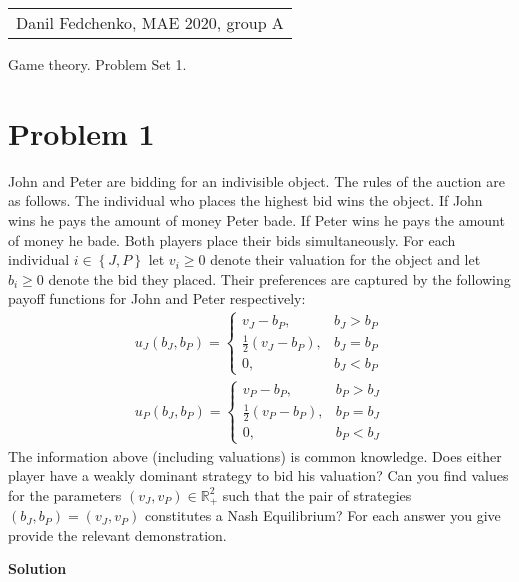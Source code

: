 \documentclass[a4paper]{article}
\begin{document}
	\begin{flushright}
	\begin{tabular}{r}
		Danil Fedchenko, MAE 2020, group A \\
	\end{tabular}
\end{flushright}


\begin{center}
	Game theory. Problem Set 1.
\end{center}
\section*{Problem 1}
John and Peter are bidding for an indivisible object. The rules of the
auction are as follows. The individual who places the highest bid wins the
object. If John wins he pays the amount of money Peter bade. If Peter
wins he pays the amount of money he bade. Both players place their bids
simultaneously. For each individual $i \in \left\{J, P\right\}$ let $v_i \ge 0$ denote their
valuation for the object and let $b_i \ge 0$ denote the bid they placed. Their
preferences are captured by the following payoff functions for John and
Peter respectively:
\begin{align*}
u_J(b_J, b_P) = \begin{cases}
v_J - b_P, &b_J > b_P\\
\frac{1}{2}(v_J - b_P), &b_J = b_P\\
0, &b_J < b_P
\end{cases}\\
u_P(b_J, b_P) = \begin{cases}
v_P - b_P, &b_P > b_J\\
\frac{1}{2}(v_P - b_P), &b_P = b_J\\
0, &b_P < b_J
\end{cases}
\end{align*}
The information above (including valuations) is common knowledge. Does
either player have a weakly dominant strategy to bid his valuation? Can
you find values for the parameters $(v_J , v_P ) \in \mathbb{R}^2_+$ such that the pair of
strategies $(b_J , b_P ) = (v_J , v_P)$ constitutes a Nash Equilibrium? For each
answer you give provide the relevant demonstration.


\textbf{Solution}
\end{document}
